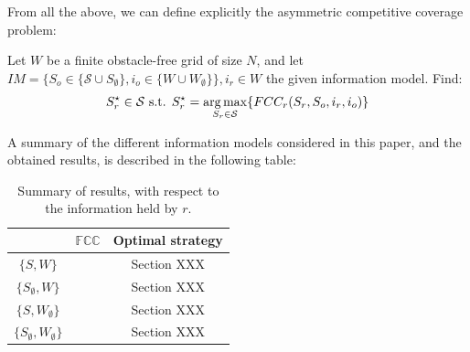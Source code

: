 \documentclass[a4paper,10pt]{article}
\newcommand\rob{\ensuremath{r}\xspace}
\newcommand\opp{\ensuremath{o}\xspace}
\newcommand{\w}{\ensuremath{W}\xspace}
\newcommand{\fcc}{\ensuremath{FCC}\xspace}
\DeclareMathOperator*{\argmax}{arg\,max} %
\begin{document}
From all the above, we can define explicitly the asymmetric competitive coverage problem:

\begin{mdframed}[backgroundcolor=gray!20] 
Let \w be a finite obstacle-free grid of size $N$, and let $IM=\lbrace S_{\opp}\in \lbrace \mathcal{S}\cup S_{\emptyset} \rbrace,i_{\opp}\in \lbrace \w \cup \w_{\emptyset} \rbrace \rbrace,i_{\rob}\in\w$ the given information model. Find: \[ S_{\rob}^\star \in \mathcal{S} \textnormal{ s.t. } S_{\rob}^\star =\argmax_{S_{\rob}\in\mathcal{S}} \lbrace \fcc_{r}(S_{\rob}, S_{\opp}, i_{\rob}, i_{\opp} ) \rbrace\]
\end{mdframed}


A summary of the different information models considered in this paper, and the obtained results, is described in the following table:

%

\begin{table}
\caption{Summary of results, with respect to the information held by \rob.}
\label{table_example}
\begin{center}
\begin{tabular}{|c||c|c|}
\hline 
& $\mathbb{\fcc}$ & Optimal strategy\\
\hline
$\lbrace S, \w \rbrace$ &  & Section XXX\\
\hline
$\lbrace S_{\emptyset}, \w \rbrace$ &  & Section XXX\\
\hline
$\lbrace S, \w_{\emptyset} \rbrace$ &  & Section XXX\\
\hline
$\lbrace S_{\emptyset}, \w_{\emptyset} \rbrace$ &  & Section XXX\\
\hline
\end{tabular}
\end{center}
\end{table}
\end{document}
